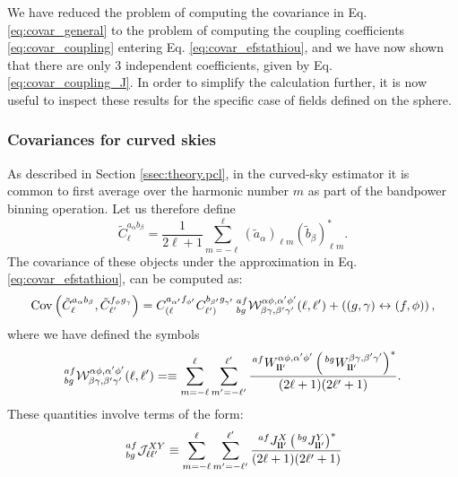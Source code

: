 \documentclass[a4paper,11pt]{article}
\begin{document}
      We have reduced the problem of computing the covariance in Eq. \ref{eq:covar_general} to the problem of computing the coupling coefficients \ref{eq:covar_coupling} entering Eq. \ref{eq:covar_efstathiou}, and we have now shown that there are only 3 independent coefficients, given by Eq. \ref{eq:covar_coupling_J}. In order to simplify the calculation further, it is now useful to inspect these results for the specific case of fields defined on the sphere.
    
      \subsubsection{Covariances for curved skies}
        As described in Section \ref{ssec:theory.pcl}, in the curved-sky estimator it is common to first average over the harmonic number $m$ as part of the bandpower binning operation. Let us therefore define
        \begin{equation}
          \tilde{C}^{a_\alpha b_\beta}_\ell=\frac{1}{2\ell+1}\sum_{m=-\ell}^\ell (\tilde{a}_\alpha)_{\ell m} (\tilde{b}_\beta)_{\ell m}^*.
        \end{equation}
        The covariance of these objects under the approximation in Eq. \ref{eq:covar_efstathiou}, can be computed as:
        \begin{equation}\label{eq:cov_sph}
          {\rm Cov}\left(\tilde{C}^{a_\alpha b_\beta}_\ell,\tilde{C}^{f_\phi g_\gamma}_{\ell'}\right) = C^{a_{\alpha'} f_{\phi'}}_{(\ell}C^{b_{\beta'} g_{\gamma'}}_{\ell')}\,^{af}_{bg}\mathcal{W}^{\alpha\phi,\alpha'\phi'}_{\beta\gamma,\beta'\gamma'}(\ell,\ell')+\left((g,\gamma)\leftrightarrow(f,\phi)\right),
        \end{equation}
        where we have defined the symbols
        \begin{equation}
          ^{af}_{bg}\mathcal{W}^{\alpha\phi,\alpha'\phi'}_{\beta\gamma,\beta'\gamma'}(\ell,\ell')=\equiv\sum_{m=-\ell}^\ell \sum_{m'=-\ell'}^{\ell'}\frac{\,^{af}W^{\alpha\phi,\alpha'\phi'}_{{\bf l}{\bf l}'}\left(\,^{bg}W^{\beta\gamma,\beta'\gamma'}_{{\bf l}{\bf l}'}\right)^*}{(2\ell+1)(2\ell'+1)}.
        \end{equation}
        These quantities involve terms of the form:
        \begin{equation}
          \,^{af}_{bg}\mathcal{J}^{XY}_{\ell\ell'}\equiv\sum_{m=-\ell}^\ell \sum_{m'=-\ell'}^{\ell'}\frac{\,^{af}J^X_{{\bf l}{\bf l}'}\left(\,^{bg}J^Y_{{\bf l}{\bf l}'}\right)^*}{(2\ell+1)(2\ell'+1)}
        \end{equation}
\end{document}
